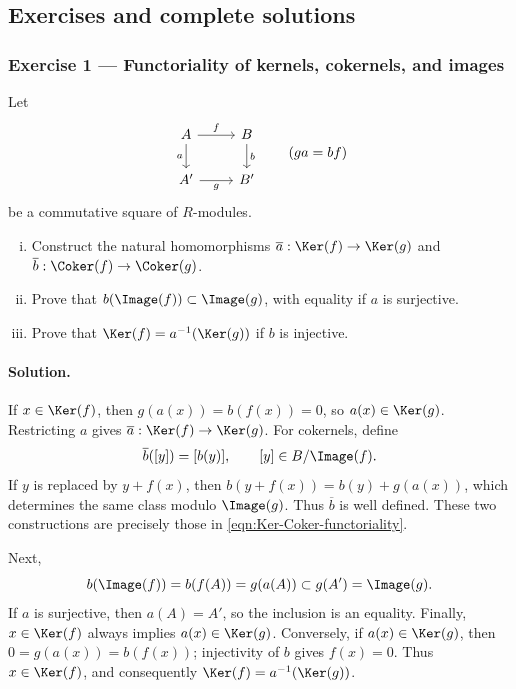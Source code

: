 \subsection*{Exercises and complete solutions}

\subsubsection*{Exercise 1 --- Functoriality of kernels, cokernels, and images}
\hypertarget{o014.mastery.diagram-chasing.001.ex01}{ }
\label{mastery:diagram-chasing-001-ex01}

Let
\[
\begin{tikzcd}
	A \arrow[r, "f"] \arrow[d, "a"'] & B \arrow[d, "b"] \\
	A' \arrow[r, "g"'] & B'
\end{tikzcd}
\qquad (ga=bf)
\]
be a commutative square of $R$-modules.
\begin{enumerate}[(i)]
	\item Construct the natural homomorphisms
	$\overline a:\Ker(f)\to\Ker(g)$ and
	$\overline b:\Coker(f)\to\Coker(g)$.
	\item Prove that $b(\Image(f))\subset\Image(g)$, with equality if $a$
	is surjective.
	\item Prove that $\Ker(f)=a^{-1}(\Ker(g))$ if $b$ is injective.
\end{enumerate}

\paragraph{Solution.}
\hypertarget{o014.mastery.diagram-chasing.001.sol01}{ }
If $x\in\Ker(f)$, then $g(a(x))=b(f(x))=0$, so
$a(x)\in\Ker(g)$. Restricting $a$ gives
$\overline a:\Ker(f)\to\Ker(g)$. For cokernels, define
\[
	\overline b([y])=[b(y)], \qquad [y]\in B/\Image(f).
\]
If $y$ is replaced by $y+f(x)$, then
$b(y+f(x))=b(y)+g(a(x))$, which determines the same class modulo
$\Image(g)$. Thus $\overline b$ is well defined. These two constructions
are precisely those in \eqref{eqn:Ker-Coker-functoriality}.

Next,
\[
	b(\Image(f))=b(f(A))=g(a(A))\subset g(A')=\Image(g).
\]
If $a$ is surjective, then $a(A)=A'$, so the inclusion is an equality.
Finally, $x\in\Ker(f)$ always implies $a(x)\in\Ker(g)$. Conversely, if
$a(x)\in\Ker(g)$, then $0=g(a(x))=b(f(x))$; injectivity of $b$ gives
$f(x)=0$. Thus $x\in\Ker(f)$, and consequently
$\Ker(f)=a^{-1}(\Ker(g))$.

